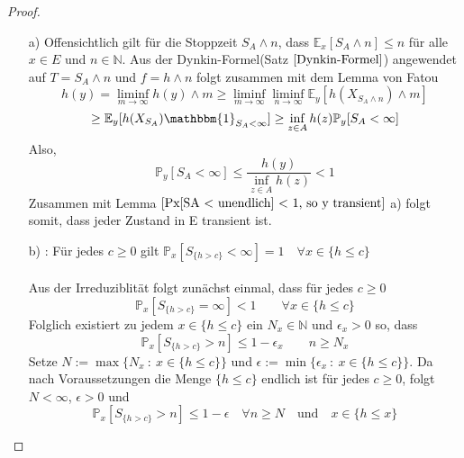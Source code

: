 \documentclass[a4paper,12pt]{scrartcl}
\theoremstyle{definition}
\begin{document}
\begin{proof}
\mbox{}
\begin{itemize}
\item[a)] Offensichtlich gilt für die Stoppzeit $S_{A} \wedge n$, dass $\mathbb{E}_{x}[S_{A} \wedge n] \leq n$ für alle $x \in E$ und $n \in \mathbb{N}$. Aus der Dynkin-Formel(Satz $\ref{Dynkin-Formel}$) angewendet auf $T = S_{A} \wedge n$ und $f = h \wedge n$ folgt zusammen mit dem Lemma von Fatou
\begin{equation*}
h(y) = \liminf_{m \to \infty} h(y) \wedge m \geq \liminf_{m \to \infty}
\liminf_{n \to \infty} \mathbb{E}_{y}[h(X_{S_{A} \wedge n}) \wedge m] 
\end{equation*}
\begin{equation*}
\geq \mathbb{E}_{y}[h(X_{S_{A}})\mathbbm{1}_{S_{A} < \infty}] \geq \inf_{z \in A} h(z) \mathbb{P}_{y}[S_{A} < \infty]
\end{equation*}
Also,
\begin{equation*}
\mathbb{P}_{y}[S_{A}< \infty] \leq \dfrac{h(y)}{\inf_{z \in A} h(z)} < 1
\end{equation*}
Zusammen mit Lemma $\ref{Px[SA < unendlich] < 1, so y transient}$ a) folgt somit, dass jeder Zustand in E transient ist.
\item[b)] : Für jedes $c \geq 0$ gilt $\mathbb{P}_{x}[S_{\lbrace h > c \rbrace} < \infty] = 1 \quad \forall x \in \lbrace h \leq c \rbrace$
\\
\\
Aus der Irreduziblität folgt zunächst einmal, dass für jedes $c \geq 0$
\begin{equation*}
\mathbb{P}_{x}[S_{\lbrace h > c \rbrace} = \infty] < 1 \qquad \forall x \in \lbrace h \leq c \rbrace
\end{equation*}
Folglich existiert zu jedem $x \in \lbrace h \leq c \rbrace$ ein $N_{x} \in \mathbb{N}$ und $\epsilon_{x} > 0$ so, dass
\begin{equation*}
\mathbb{P}_{x}[S_{\lbrace h > c \rbrace} > n] \leq 1 - \epsilon_{x} \qquad n \geq N_{x}
\end{equation*}
Setze $N := \max {\lbrace N_{x} \: : \: x \in {\lbrace h \leq c \rbrace}  \rbrace}$ und $\epsilon := \min \lbrace \epsilon_{x} \: : \: x \in \lbrace h \leq c \rbrace \rbrace$. Da nach Voraussetzungen die Menge $\lbrace h \leq c \rbrace$ endlich ist für jedes $c \geq 0$, folgt $N < \infty$, $\epsilon > 0$ und
\begin{equation*}
\mathbb{P}_{x}[S_{\lbrace h > c \rbrace} > n] \leq 1 - \epsilon \quad \forall n \geq N \quad \mathrm{und} \quad x \in {\lbrace h \leq x \rbrace}

\end{equation*}
\end{itemize}
\end{proof}
\end{document}

